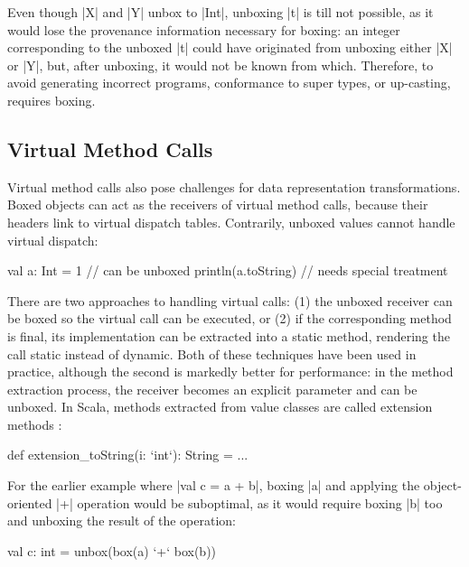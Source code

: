 Even though |X| and |Y| unbox to |Int|, unboxing |t| is till not possible, as it would lose the provenance information necessary for boxing: an integer corresponding to the unboxed |t| could have originated from unboxing either |X| or |Y|, but, after unboxing, it would not be known from which. Therefore, to avoid generating incorrect programs, conformance to super types, or up-casting, requires boxing.

\subsection{Virtual Method Calls}
\label{sec:problem-oo/virtual-method-calls}

Virtual method calls also pose challenges for data representation transformations. Boxed objects can act as the receivers of virtual  method calls, because their headers link to virtual dispatch tables. Contrarily, unboxed values cannot handle virtual dispatch:

\begin{lstlisting-nobreak}
 val a: Int = 1             // can be unboxed
 println(a.toString) // needs special treatment
\end{lstlisting-nobreak}

There are two approaches to handling virtual calls: (1) the unboxed receiver can be boxed so the virtual call can be executed, or (2) if the corresponding method is final, its implementation can be extracted into a static method, rendering the call static instead of dynamic. Both of these techniques have been used in practice, although the second is markedly better for performance: in the method extraction process, the receiver becomes an explicit parameter and can be unboxed. In Scala, methods extracted from value classes are called extension methods \cite{scala-value-classes-sip}:

\begin{lstlisting-nobreak}
 def extension_toString(i: `int`): String = ...
\end{lstlisting-nobreak}

For the earlier example where |val c = a + b|, boxing |a| and applying the object-oriented |+| operation would be suboptimal, as it would require boxing |b| too and unboxing the result of the operation:

\begin{lstlisting-nobreak}
 val c: int = unbox(box(a) `+` box(b))
\end{lstlisting-nobreak}

